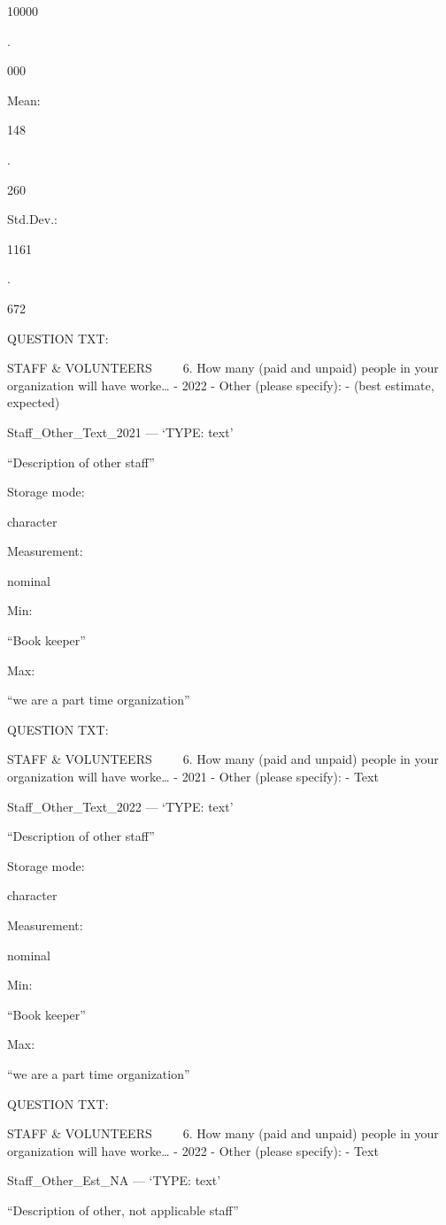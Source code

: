 \documentclass[
  letterpaper,
]{scrbook}
\begin{document}
10000

.

000

Mean:

148

.

260

Std.Dev.:

1161

.

672

QUESTION TXT:

STAFF \& VOLUNTEERS ~~ ~ 6. How many (paid and unpaid) people in your
organization will have worke\ldots{} - 2022 - Other (please specify): -
(best estimate, expected)

Staff\_Other\_Text\_2021 --- {`TYPE: text'}

``Description of other staff''

Storage mode:

character

Measurement:

nominal

Min:

``Book keeper''

Max:

``we are a part time organization''

QUESTION TXT:

STAFF \& VOLUNTEERS ~~ ~ 6. How many (paid and unpaid) people in your
organization will have worke\ldots{} - 2021 - Other (please specify): -
Text

Staff\_Other\_Text\_2022 --- {`TYPE: text'}

``Description of other staff''

Storage mode:

character

Measurement:

nominal

Min:

``Book keeper''

Max:

``we are a part time organization''

QUESTION TXT:

STAFF \& VOLUNTEERS ~~ ~ 6. How many (paid and unpaid) people in your
organization will have worke\ldots{} - 2022 - Other (please specify): -
Text

Staff\_Other\_Est\_NA --- {`TYPE: text'}

``Description of other, not applicable staff''
\end{document}
